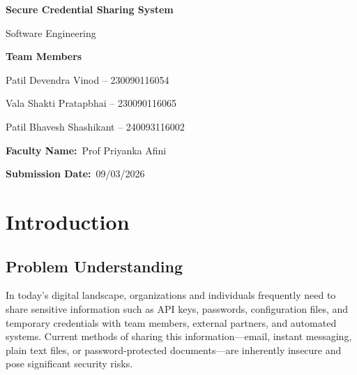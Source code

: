 \documentclass[12pt,a4paper]{article}
\title{\fontsize{16pt}{19.2pt}\selectfont \projecttitle}
\author{\subjectname\\[0.5em]
  Team Members: \teammemberone, \teammembertwo, \teammemberthree\\
  Faculty: \facultyname\\
  Date: \submissiondate}
\date{}
\newcommand{\projecttitle}{Secure Credential Sharing System}
\newcommand{\subjectname}{Software Engineering}
\newcommand{\facultyname}{Prof Priyanka Afini}
\newcommand{\submissiondate}{09/03/2026}
\newcommand{\teammemberone}{Patil Devendra Vinod -- 230090116054}
\newcommand{\teammembertwo}{Vala Shakti Pratapbhai -- 230090116065}
\newcommand{\teammemberthree}{Patil Bhavesh Shashikant -- 240093116002}
\begin{document}
\begin{titlepage}
  \centering
  \vspace*{2cm}
  {\fontsize{20pt}{24pt}\selectfont \textbf{\projecttitle}\par}
  \vspace{1.5cm}
  {\fontsize{14pt}{16.8pt}\selectfont \subjectname\par}
  \vspace{2cm}
  {\fontsize{12pt}{18pt}\selectfont
    \textbf{Team Members}\par
    \teammemberone\par
    \teammembertwo\par
    \teammemberthree\par
  }
  \vspace{1.5cm}
  {\fontsize{12pt}{18pt}\selectfont
    \textbf{Faculty Name:}\ \facultyname\par
    \textbf{Submission Date:}\ \submissiondate\par
  }
  \vfill
\end{titlepage}

\pagestyle{fancy}
\setcounter{page}{2}

\tableofcontents
\newpage

\setcounter{page}{1}

\fontsize{12pt}{18pt}\selectfont

\section{Introduction}

\subsection{Problem Understanding}

In today's digital landscape, organizations and individuals frequently need to share sensitive information such as API keys, passwords, configuration files, and temporary credentials with team members, external partners, and automated systems. Current methods of sharing this information---email, instant messaging, plain text files, or password-protected documents---are inherently insecure and pose significant security risks.
\end{document}

